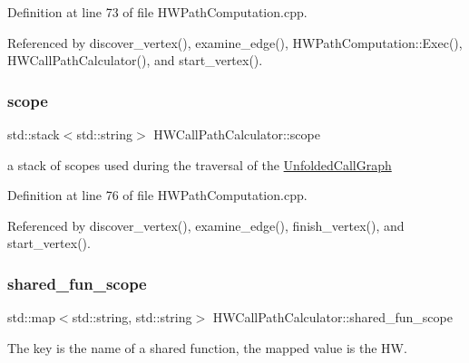 Definition at line 73 of file H\+W\+Path\+Computation.\+cpp.



Referenced by discover\+\_\+vertex(), examine\+\_\+edge(), H\+W\+Path\+Computation\+::\+Exec(), H\+W\+Call\+Path\+Calculator(), and start\+\_\+vertex().

\mbox{\label{classHWCallPathCalculator_af8a6a9326069aabe7c4794d27d050cff}} 
\subsubsection{\texorpdfstring{scope}{scope}}
{\footnotesize\ttfamily std\+::stack$<$std\+::string$>$ H\+W\+Call\+Path\+Calculator\+::scope\hspace{0.3cm}{\ttfamily [protected]}}



a stack of scopes used during the traversal of the \hyperlink{classUnfoldedCallGraph}{Unfolded\+Call\+Graph} 



Definition at line 76 of file H\+W\+Path\+Computation.\+cpp.



Referenced by discover\+\_\+vertex(), examine\+\_\+edge(), finish\+\_\+vertex(), and start\+\_\+vertex().

\mbox{\label{classHWCallPathCalculator_a1c46c538712d447372be06463edcfae0}} 
\subsubsection{\texorpdfstring{shared\+\_\+fun\+\_\+scope}{shared\_fun\_scope}}
{\footnotesize\ttfamily std\+::map$<$std\+::string, std\+::string$>$ H\+W\+Call\+Path\+Calculator\+::shared\+\_\+fun\+\_\+scope\hspace{0.3cm}{\ttfamily [protected]}}



The key is the name of a shared function, the mapped value is the HW. 



